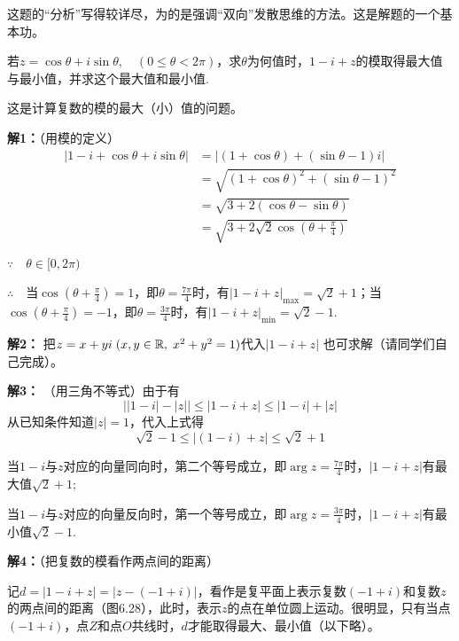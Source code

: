 \begin{rmk}
这题的“分析”写得较详尽，为的是强调“双向”发散思维的方法。这是解题的一个基本功。
\end{rmk}


\begin{example}
    若$z=\cos\theta+i\sin\theta,\quad (0\le \theta<2\pi)$，求$\theta$为何值时，$1-i+z$的模取得最大值与最小值，并求这个最大值和最小值.
\end{example}

\begin{analyze}
    这是计算复数的模的最大（小）值的问题。
\end{analyze}

\begin{solution}
\textbf{解1：}（用模的定义）
\[\begin{split}
    |1-i+\cos\theta+i\sin\theta|&=|(1+\cos\theta)+(\sin\theta-1)i|\\
&=\sqrt{(1+\cos\theta)^2+(\sin\theta-1)^2}\\
&=\sqrt{3+2(\cos\theta-\sin\theta)}\\
&=\sqrt{3+2\sqrt{2}\cos\left(\theta+\frac{\pi}{4}\right)}
\end{split}\]

$\because\quad \theta\in[0,2\pi)$

$\therefore\quad $当$\cos\left(\theta+\frac{\pi}{4}\right)=1$，即$\theta=\frac{7\pi}{4}$时，有$|1-i+z|_{\max}=\sqrt{2}+1$；当$\cos\left(\theta+\frac{\pi}{4}\right)=-1$，即$\theta=\frac{3\pi}{4}$时，有$|1-i+z|_{\min}=\sqrt{2}-1$.

\textbf{解2：}
把$z=x+yi\; (x,y\in\mathbb{R},\; x^2+y^2=1)$代入$|1-i+z|$ 也可求解（请同学们自己完成）。

\textbf{解3：}
（用三角不等式）由于有
\[\big||1-i|-|z|\big|\le |1-i+z|\le |1-i|+|z|\]
从已知条件知道$|z|=1$，代入上式得
\[\sqrt{2}-1\le |(1-i)+z|\le \sqrt{2}+1\]

当$1-i$与$z$对应的向量同向时，第二个等号成立，即$\arg z=\frac{7\pi}{4}$时，$|1-i+z|$有最大值$\sqrt{2}+1$;

当$1-i$与$z$对应的向量反向时，第一个等号成立，即$\arg z=\frac{3\pi}{4}$时，$|1-i+z|$有最小值$\sqrt{2}-1$.

\noindent
\begin{minipage}{.55\textwidth}
    \CTEXindent
\textbf{解4：}（把复数的模看作两点间的距离）

记$d=|1-i+z|=|z-(-1+i)|$，看作是复平面上表示复数$(-1+i)$和复数$z$的两点间的距离（图6.28），此时，表示$z$的点在单位圆上运动。很明显，只有当点$(-1+i)$，点$Z$和点$O$共线时，$d$才能取得最大、最小值（以下略）。
\end{minipage}
\begin{minipage}{.4\textwidth}
\centering{}
\end{minipage}
\end{solution}
